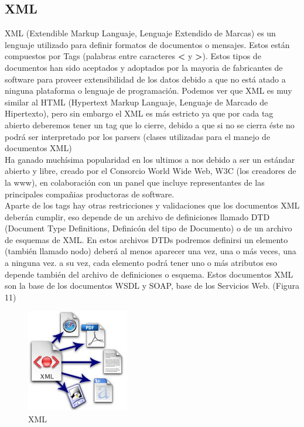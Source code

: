 \documentclass[12pt,letterpaper,titlepage]{article}
\begin{document}
\subsection{XML}\label{xml}
XML (Extendible Markup Languaje, Lenguaje Extendido de Marcas) es un lenguaje utilizado para definir formatos de documentos o mensajes. Estos están compuestos por Tags (palabras entre caracteres \textbf{<} y \textbf{>}). Estos tipos de documentos han sido aceptados y adoptados por la mayoria de fabricantes de software para proveer extensibilidad de los datos debido a que no está atado a ninguna plataforma o lenguaje de programación. Podemos ver que XML es muy similar al HTML (Hypertext Markup Languaje, Lenguaje de Marcado de Hipertexto), pero sin embargo el XML es más estricto ya que por cada tag abierto deberemos tener un tag que lo cierre, debido a que si no se cierra éste no podrá ser interpretado por los parsers (clases utilizadas para el manejo de documentos XML)\\

Ha ganado muchísima popularidad en los ultimos a  nos debido a ser un estándar abierto y libre, creado por el Consorcio World Wide Web, W3C (los creadores de la www), en colaboración con un panel que incluye representantes de las principales compañias productoras de software.\\

Aparte de los tags hay otras restricciones y validaciones que los documentos XML deberán cumplir, eso depende de un archivo de definiciones llamado DTD (Document Type Definitions, Definicón del tipo de Documento) o de un archivo de esquemas de XML. En estos archivos DTDs podremos definirsi un elemento (también llamado nodo) deberá al menos aparecer una vez, una o más veces, una a ninguna vez. a su vez, cada elemento podrá tener uno o más atributos eso depende también del archivo de definiciones o esquema. Estos documentos XML son la base de los documentos WSDL y SOAP, base de los Servicios Web. (Figura 11)\\

\begin{figure}
  \centering
    \includegraphics[width=0.4\textwidth]{11_xml}
  \caption{XML}
  \label{fig11:xml}
\end{figure}
\end{document}
